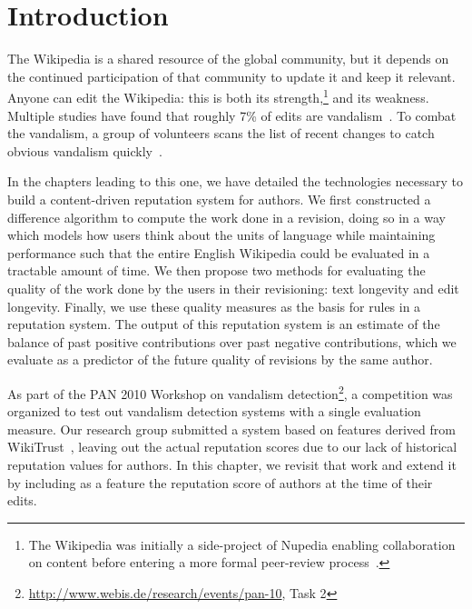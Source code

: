\section{Introduction}

The Wikipedia is a shared resource of the global community, but it depends on
the continued participation of that community to update it and keep it relevant.
Anyone can edit the Wikipedia: this is both its strength,\footnote{The Wikipedia
was initially a side-project of Nupedia enabling collaboration on content
before entering a more formal peer-review process~\cite{wiki:Nupedia}.}
and its weakness.
Multiple studies have found that roughly 7\% of edits are
vandalism~\cite{Potthast2008,Potthast2010a}.
To combat the vandalism, a group of volunteers scans the list of recent changes
to catch obvious vandalism quickly~\cite{wiki:RCPatrol}.

In the chapters leading to this one, we have detailed the technologies
necessary to build a content-driven reputation system for authors.
We first constructed a difference algorithm to compute the work done in a
revision, doing so in a way which models how users think about the units of
language while maintaining performance such that the entire English Wikipedia
could be evaluated in a tractable amount of time.
We then propose two methods for evaluating the quality of the work done by the
users in their revisioning: text longevity and edit longevity.
Finally, we use these quality measures as the basis for rules in a reputation
system.
The output of this reputation system is an estimate of the balance of past
positive contributions over past negative contributions, which we evaluate
as a predictor of the future quality of revisions by the same author.

As part of the PAN 2010 Workshop on vandalism
detection\footnote{\url{http://www.webis.de/research/events/pan-10}, Task 2},
a competition was organized to test out vandalism detection systems with a
single evaluation measure.
Our research group submitted a system based on features derived from
WikiTrust~\cite{Adler2010}, leaving out the actual reputation scores due
to our lack of historical reputation values for authors.
In this chapter, we revisit that work and extend it by including as a feature
the reputation score of authors at the time of their edits.

